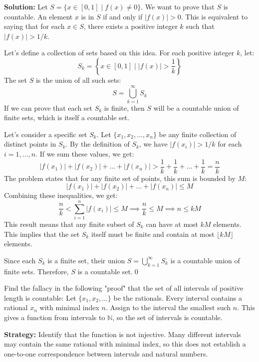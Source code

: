 \bigskip\noindent\textbf{Solution:}  
Let $S = \{x \in [0,1] \mid f(x) \ne 0\}$. We want to prove that $S$ is countable.
An element $x$ is in $S$ if and only if $|f(x)| > 0$.
This is equivalent to saying that for each $x \in S$, there exists a positive integer $k$ such that $|f(x)| > 1/k$.

Let's define a collection of sets based on this idea. For each positive integer $k$, let:
\[ S_k = \left\{ x \in [0,1] \mid |f(x)| > \frac{1}{k} \right\} \]
The set $S$ is the union of all such sets:
\[ S = \bigcup_{k=1}^{\infty} S_k \]
If we can prove that each set $S_k$ is finite, then $S$ will be a countable union of finite sets, which is itself a countable set.

Let's consider a specific set $S_k$. Let $\{x_1, x_2, \dots, x_n\}$ be any finite collection of distinct points in $S_k$.
By the definition of $S_k$, we have $|f(x_i)| > 1/k$ for each $i=1, \dots, n$.
If we sum these values, we get:
\[ |f(x_1)| + |f(x_2)| + \dots + |f(x_n)| > \frac{1}{k} + \frac{1}{k} + \dots + \frac{1}{k} = \frac{n}{k} \]
The problem states that for any finite set of points, this sum is bounded by $M$:
\[ |f(x_1)| + |f(x_2)| + \dots + |f(x_n)| \le M \]
Combining these inequalities, we get:
\[ \frac{n}{k} < \sum_{i=1}^n |f(x_i)| \le M \implies \frac{n}{k} \le M \implies n \le kM \]
This result means that any finite subset of $S_k$ can have at most $kM$ elements. This implies that the set $S_k$ itself must be finite and contain at most $\lfloor kM \rfloor$ elements.

Since each $S_k$ is a finite set, their union $S = \bigcup_{k=1}^{\infty} S_k$ is a countable union of finite sets. Therefore, $S$ is a countable set.\qed



\begin{problembox}
Find the fallacy in the following "proof" that the set of all intervals of positive length is countable:  
Let \( \{x_1, x_2, \ldots\} \) be the rationals. Every interval contains a rational \( x_n \) with minimal index \( n \).  
Assign to the interval the smallest such \( n \). This gives a function from intervals to \( \mathbb{N} \), so the set of intervals is countable.
\end{problembox}

\noindent\textbf{Strategy:} Identify that the function is not injective. Many different intervals may contain the same rational with minimal index, so this does not establish a one-to-one correspondence between intervals and natural numbers.

